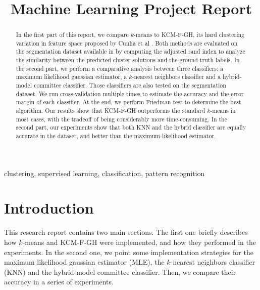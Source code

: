 \documentclass[conference]{IEEEtran}
\begin{document}
\title{Machine Learning Project Report}

\author{
}


\maketitle

\begin{abstract}
In the first part of this report, we compare $k$-means to KCM-F-GH, its hard clustering variation in feature space proposed by Cunha et al \cite{??}.
Both methods are evaluated on the segmentation dataset available in \cite{??} by 
computing the adjusted rand index to analyze the similarity between the predicted cluster solutions and the ground-truth labels.
In the second part, we perform a comparative analysis between three classifiers: a maximum likelihood gaussian estimator, a $k$-nearest neighbors classifier and a hybrid-model committee classifier.
Those classifiers are also tested on the segmentation dataset.
We run cross-validation multiple times to estimate the accuracy and the error margin of each classifier.
At the end, we perform Friedman test to determine the best algorithm.
Our results show that KCM-F-GH outperforms the standard $k$-means in most cases, with the tradeoff of being considerably more time-consuming.
In the second part, our experiments show that both KNN and the hybrid classifier are equally accurate in the dataset, and better than the maximum-likelihood estimator.


\end{abstract}

\begin{IEEEkeywords}
clustering, supervised learning, classification, pattern recognition
\end{IEEEkeywords}

\section{Introduction}
This research report contains two main sections.
The first one briefly describes how $k$-means and KCM-F-GH were implemented, and how they performed in the experiments.
In the second one, we point some implementation strategies for the maximum likelihood gaussian estimator (MLE), the $k$-nearest neighbors classifier (KNN) and the hybrid-model committee classifier. Then, we compare their accuracy in a series of experiments.
\end{document}
